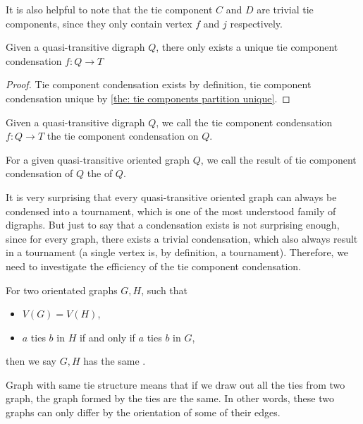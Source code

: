 It is also helpful to note that the tie component \(C\) and \(D\)
are trivial tie components,
since they only contain vertex \(f\) and \(j\) respectively.

\begin{corollary}
  Given a quasi-transitive digraph \(Q\),
  there only exists a unique tie component condensation
  \(f: Q \to T\)
\end{corollary}
\begin{proof}
  Tie component condensation exists by definition,
  tie component condensation unique
  by \cref{the: tie components partition unique}.
\end{proof}

\begin{definition}
  Given a quasi-transitive digraph \(Q\),
  we call the tie component condensation \(f: Q \to T\)
  the tie component condensation on \(Q\).
\end{definition}

\begin{definition}
  For a given quasi-transitive oriented graph \(Q\),
  we call the result of tie component condensation of \(Q\)
  the  of \(Q\).
\end{definition}

It is very surprising that every
quasi-transitive oriented graph
can always be condensed into a tournament,
which is one of the most understood family of digraphs.
But just to say that a condensation exists is not surprising enough,
since for every graph, there exists a trivial condensation,
which also always result in a tournament
(a single vertex is, by definition, a tournament).
Therefore, we need to investigate the efficiency of the tie
component condensation.

\begin{definition}
  For two orientated graphs \(G, H\), such that
  \begin{itemize}
    \item \(V(G) = V(H)\),
    \item \(a\) ties \(b\) in \(H\) if and only if
      \(a\) ties \(b\) in \(G\),
  \end{itemize}
  then we say \(G, H\) has the same .
\end{definition}

Graph with same tie structure means
that if we draw out all the ties from two graph,
the graph formed by the ties are the same.
In other words, these two graphs can only differ
by the orientation of some of their edges.

